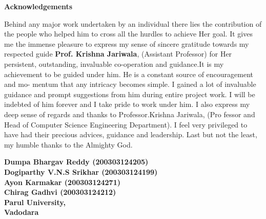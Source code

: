 \thispagestyle{empty}
\newpage
\cleardoublepage{}
{}
\begin{center}
{\Large \bf Acknowledgements}\\
\end{center}
\vspace{10pt}
\begin{flushright}
\end{flushright}


Behind any major work undertaken by an individual there lies the contribution of the people
who helped him to cross all the hurdles to achieve Her goal. It gives me the immense pleasure to
express my sense of sincere gratitude towards my respected guide \textbf{Prof. Krishna Jariwala},
(Assistant Professor) for Her persistent, outstanding, invaluable co-operation and guidance.It is my
achievement to be guided under him. He is a constant source of encouragement and mo- mentum
that any intricacy becomes simple. I gained a lot of invaluable guidance and prompt suggestions
from him during entire project work. I will be indebted of him forever and I take pride to work
under him. I also express my deep sense of regards and thanks to Professor.Krishna Jariwala, (Pro
fessor and Head of Computer Science Engineering Department). I feel very privileged to have had
their precious advices, guidance and leadership. Last but not the least, my humble thanks to the
Almighty God.


\vspace{1.5cm}
\begin{flushright}
\textbf{Dumpa Bhargav Reddy (200303124205) \\ Dogiparthy V.N.S Srikhar (200303124199) \\ Ayon Karmakar (200303124271) \\ Chirag Gadhvi (200303124212) \\ Parul University, \\ Vadodara}\\ 
\end{flushright}